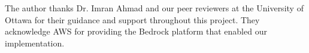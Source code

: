 \documentclass[sigplan,screen]{acmart}
\begin{document}

\maketitle








\begin{acks}
The author thanks Dr. Imran Ahmad and our peer reviewers at the University of Ottawa for their guidance and support throughout this project. They acknowledge AWS for providing the Bedrock platform that enabled our implementation.
\end{acks}



\end{document}
